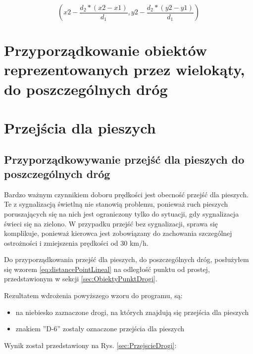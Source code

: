 \begin{equation} \label{eq:calculatedCoordinates}
(x2 - \frac{d_2*(x2 - x1)}{d_1}, y2 - \frac{d_2*(y2 - y1)}{d_1})
\end{equation}\newline

\newpage
\section{Przyporządkowanie obiektów reprezentowanych przez wielokąty, do poszczególnych dróg}
\label{sec:polygonLineDistance}

\newpage
\section{Przejścia dla pieszych}
\label{sec:pedestrialCrossing}
\subsection{Przyporządkowywanie przejść dla pieszych do poszczególnych dróg}

Bardzo ważnym czynnikiem doboru prędkości jest obecność przejść dla pieszych. Te z sygnalizacją świetlną nie stanowią problemu, ponieważ ruch pieszych poruszających się na nich jest ograniczony tylko do sytuacji, gdy sygnalizacja świeci się na zielono. W przypadku przejść bez sygnalizacji, sprawa się komplikuje, ponieważ kierowca jest zobowiązany do zachowania szczególnej ostrożności i zmiejszenia prędkości od 30 km/h. 

Do przyporządkowania przejść dla pieszych, do poszczególnych dróg, posłużyłem się wzorem \ref{eq:distancePointLineal} na odległość punktu od prostej, przedstawionym w sekcji \ref{sec:ObiektyPunktDrogi}.


Rezultatem wdrożenia powyższego wzoru do programu, są:
\begin{itemize}
\item na niebiesko zaznaczone drogi, na których znajdują się przejścia dla pieszych
\item znakiem ''D-6'' zostały oznaczone przejścia dla pieszych
\end{itemize} 
Wynik został przedstawiony na Rys. \ref{sec:PrzejscieDrogi}:

